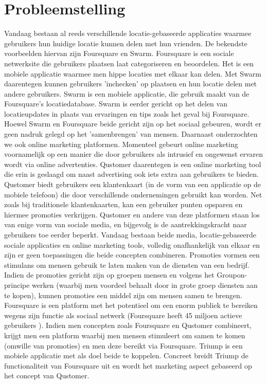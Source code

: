 \chapter{Probleemstelling}


Vandaag bestaan al reeds verschillende locatie-gebaseerde applicaties waarmee gebruikers hun huidige locatie kunnen delen met hun vrienden. De bekendste voorbeelden hiervan zijn Foursquare\cite{foursquare} en Swarm\cite{swarm}. Foursquare is een sociale netwerksite die gebruikers plaatsen laat categoriseren en beoordelen. Het is een mobiele applicatie waarmee men hippe locaties met elkaar kan delen. Met Swarm daarentegen kunnen gebruikers 'inchecken' op plaatsen en hun locatie delen met andere gebruikers. Swarm is een mobiele applicatie, die gebruik maakt van de Foursquare's locatiedatabase. Swarm is eerder gericht op het delen van locatieupdates in plaats van ervaringen en tips zoals het geval bij Foursquare.
Hoewel Swarm en Foursquare beide gericht zijn op het sociaal gebeuren, wordt er geen nadruk gelegd op het 'samenbrengen' van mensen. 
Daarnaast onderzochten we ook online marketing platformen. Momenteel gebeurt online marketing voornamelijk op een manier die door gebruikers als intrusief en ongewenst ervaren wordt via online advertenties. Qustomer\cite{qustomer} daarentegen is een online marketing tool die erin is geslaagd om naast advertising ook iets extra aan gebruikers te bieden. Qustomer biedt gebruikers een klantenkaart (in de vorm van een applicatie op de mobiele telefoon) die door verschillende ondernemingen gebruikt kan worden. Net zoals bij traditionele klantenkaarten, kan een gebruiker punten opsparen en hiermee promoties verkrijgen. Qustomer en andere van deze platformen staan los van enige vorm van sociale media, en bijgevolg is de aantrekkingskracht naar gebruikers toe eerder beperkt.
Vandaag bestaan beide media, locatie-gebaseerde sociale applicaties en online marketing tools, volledig onafhankelijk van elkaar en zijn er geen toepassingen die beide concepten combineren. 
Promoties vormen een stimulans om mensen gebruik te laten maken van de diensten van een bedrijf. Indien de promoties gericht zijn op groepen mensen en volgens het Groupon-principe werken (waarbij men voordeel behaalt door in grote groep diensten aan te kopen), kunnen promoties een middel zijn om mensen samen te brengen.
Foursquare is een platform met het potentieel om een enorm publiek te bereiken wegens zijn functie als sociaal netwerk (Foursquare heeft 45 miljoen actieve gebruikers \cite{users}).
Indien men concepten zoals Foursquare en Qustomer combineert, krijgt men een platform waarbij men mensen stimuleert om samen te komen (omwille van promoties) en men deze bereikt via Foursquare.
Triump is een mobiele applicatie met als doel beide te koppelen.
Concreet breidt Triump de functionaliteit van Foursquare uit en wordt het marketing aspect gebaseerd op het concept van Qustomer. 


